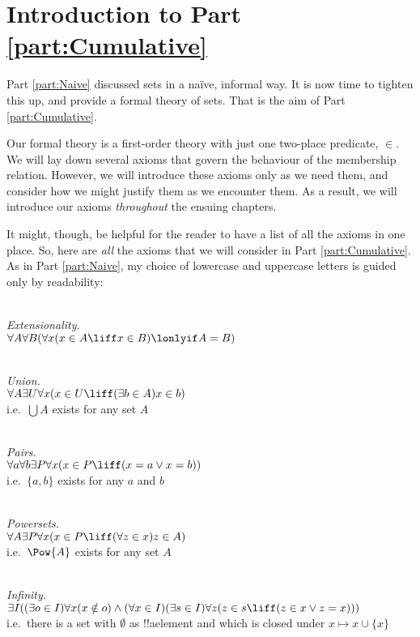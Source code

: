 \documentclass[../../../include/open-logic-chapter]{subfiles}
\begin{document}
\chapter*{Introduction to Part \ref{part:Cumulative}}
\noindent Part \ref{part:Naive} discussed sets in a na\"{i}ve, informal way. It is now time to tighten this up, and provide a formal theory of sets. That is the aim of Part \ref{part:Cumulative}. 

Our formal theory is a first-order theory with just one two-place predicate, $\in$. We will lay down several axioms that govern the behaviour of the membership relation. However, we will introduce these axioms only as we need them, and consider how we might justify them as we encounter them. As a result, we will introduce our axioms \emph{throughout} the ensuing chapters.

It might, though, be helpful for the reader to have a list of all the axioms in one place. So, here are \emph{all} the axioms that we will consider in Part \ref{part:Cumulative}. As in Part \ref{part:Naive}, my choice of lowercase and uppercase letters is guided only by readability:

\
\\\emph{Extensionality.} 
\\$\forall A \forall B(\forall x(x \in A \liff x \in B) \lonlyif A = B)$

\
\\\emph{Union.} 
\\$\forall A \exists U \forall x(x \in U \liff (\exists b \in A)x \in b)$
\\i.e.\ $\bigcup A$ exists for any set $A$

\
\\\emph{Pairs.} 
\\$\forall a \forall b \exists P \forall x (x \in P \liff (x = a \lor x = b))$
\\i.e.\ $\{a, b\}$ exists for any $a$ and $b$

\
\\\emph{Powersets.}
\\$\forall A \exists P \forall x(x \in P \liff (\forall z \in x)z \in A)$
\\i.e.\ $\Pow{A}$ exists for any set $A$

\
\\\emph{Infinity.} 	
\\$\exists I((\exists o \in I)\forall x(x \notin o) \land (\forall x \in I)(\exists s \in I)\forall z(z \in s \liff (z \in x \lor z = x)))$
\\i.e.\ there is a set with $\emptyset$ as !!a{element} and which 
is closed under $x \mapsto x \cup \{x\}$
\end{document}
